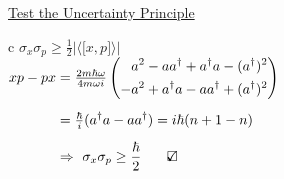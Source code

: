 \documentclass[12pt]{article}
\newcommand{\checkedbox}{\mbox{\ooalign{$\checkmark$\cr\hidewidth$\square$\hidewidth\cr}}} %
\begin{document}
\hfill
\begin{minipage}[t]{.51\textwidth}
    \setlength{\parindent}{.5cm}
    \noindent
    \underline{Test the Uncertainty Principle}
    
    \vspace{10pt}
    { \setlength{\tabcolsep}{0pt}
    \begin{tabular}{c}
        \( \sigma_x \sigma_p \geq \frac{1}{2} 
            \Big| \Big\langle \big[ x,p \big] \Big\rangle \Big| \)\\[20pt]
        \( \begin{aligned} 
            xp-px &= \tfrac{2 m \hbar \omega}{4 m \omega i}
                \left( \begin{aligned}
                      a^2 - a a^\dagger + a^\dagger a - (a^\dagger)^2 \\
                    - a^2 + a^\dagger a - a a^\dagger + (a^\dagger)^2
                \end{aligned} \right) \\[5pt]
            &= \tfrac{\hbar}{i} (a^\dagger a - a a^\dagger) = i \hbar (n+1 - n)\\[5pt]
            &\Rightarrow \ \sigma_x \sigma_p \geq \frac{\hbar}{2} \hspace{18pt} \checkedbox
        \end{aligned} \)
    \end{tabular} }
    

\end{minipage}
\end{document}
